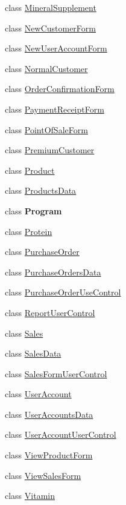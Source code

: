 \begin{DoxyCompactItemize}
\item 
class \hyperlink{class_health___assignment_1_1_mineral_supplement}{Mineral\+Supplement}
\item 
class \hyperlink{class_health___assignment_1_1_new_customer_form}{New\+Customer\+Form}
\item 
class \hyperlink{class_health___assignment_1_1_new_user_account_form}{New\+User\+Account\+Form}
\item 
class \hyperlink{class_health___assignment_1_1_normal_customer}{Normal\+Customer}
\item 
class \hyperlink{class_health___assignment_1_1_order_confirmation_form}{Order\+Confirmation\+Form}
\item 
class \hyperlink{class_health___assignment_1_1_payment_receipt_form}{Payment\+Receipt\+Form}
\item 
class \hyperlink{class_health___assignment_1_1_point_of_sale_form}{Point\+Of\+Sale\+Form}
\item 
class \hyperlink{class_health___assignment_1_1_premium_customer}{Premium\+Customer}
\item 
class \hyperlink{class_health___assignment_1_1_product}{Product}
\item 
class \hyperlink{class_health___assignment_1_1_products_data}{Products\+Data}
\item 
class {\bfseries Program}
\item 
class \hyperlink{class_health___assignment_1_1_protein}{Protein}
\item 
class \hyperlink{class_health___assignment_1_1_purchase_order}{Purchase\+Order}
\item 
class \hyperlink{class_health___assignment_1_1_purchase_orders_data}{Purchase\+Orders\+Data}
\item 
class \hyperlink{class_health___assignment_1_1_purchase_order_use_control}{Purchase\+Order\+Use\+Control}
\item 
class \hyperlink{class_health___assignment_1_1_report_user_control}{Report\+User\+Control}
\item 
class \hyperlink{class_health___assignment_1_1_sales}{Sales}
\item 
class \hyperlink{class_health___assignment_1_1_sales_data}{Sales\+Data}
\item 
class \hyperlink{class_health___assignment_1_1_sales_form_user_control}{Sales\+Form\+User\+Control}
\item 
class \hyperlink{class_health___assignment_1_1_user_account}{User\+Account}
\item 
class \hyperlink{class_health___assignment_1_1_user_accounts_data}{User\+Accounts\+Data}
\item 
class \hyperlink{class_health___assignment_1_1_user_account_user_control}{User\+Account\+User\+Control}
\item 
class \hyperlink{class_health___assignment_1_1_view_product_form}{View\+Product\+Form}
\item 
class \hyperlink{class_health___assignment_1_1_view_sales_form}{View\+Sales\+Form}
\item 
class \hyperlink{class_health___assignment_1_1_vitamin}{Vitamin}
\end{DoxyCompactItemize}
